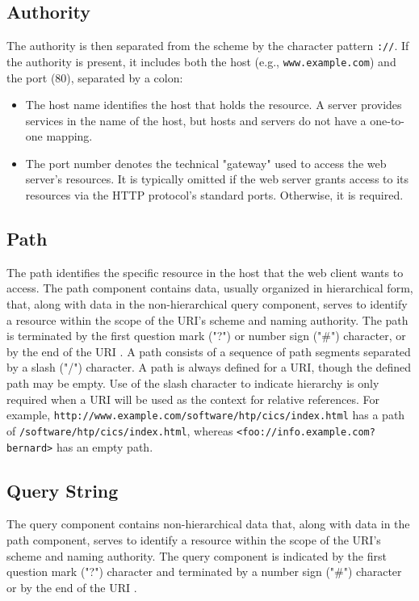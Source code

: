 \subsection*{Authority}
The authority is then separated from the scheme by the character pattern \texttt{://}. If the authority is present, it includes both the host (e.g., \texttt{www.example.com}) and the port (80), separated by a colon:

\begin{itemize}
  \item The host name identifies the host that holds the resource. A server provides services in the name of the host, but hosts and servers do not have a one-to-one mapping.
  \item The port number denotes the technical "gateway" used to access the web server's resources. It is typically omitted if the web server grants access to its resources via the HTTP protocol's standard ports. Otherwise, it is required.
\end{itemize}

\subsection*{Path}
The path identifies the specific resource in the host that the web client wants to access. The path component contains data, usually organized in hierarchical form, that, along with data in the non-hierarchical query component, serves to identify a resource within the scope of the URI's scheme and naming authority.  The path is terminated by the first question mark ("?") or number sign ("\#") character, or by the end of the URI \autocite{berners2005uniform}. A path consists of a sequence of path segments separated by a slash ("/") character.  A path is always defined for a URI, though the defined path may be empty.  Use of the slash character to indicate hierarchy is only required when a URI will be used as the context for relative references.  For example, \texttt{http://www.example.com/software/htp/cics/index.html} has a path of \texttt{/software/htp/cics/index.html}, whereas \texttt{<foo://info.example.com?bernard>} has an empty path.

\subsection*{Query String}
The query component contains non-hierarchical data that, along with data in the path component, serves to identify a resource within the scope of the URI's scheme and naming authority.  The query component is indicated by the first question mark ("?") character and terminated by a number sign ("\#") character or by the end of the URI \autocite{berners2005uniform}.

